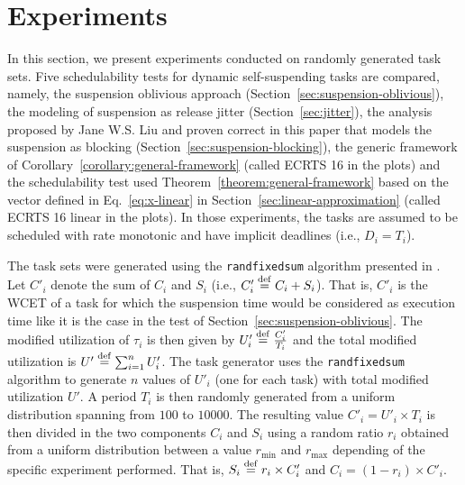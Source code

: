 \section{Experiments}
\label{sec:experiments}

In this section, we present experiments conducted on randomly generated task sets. Five schedulability tests for dynamic self-suspending tasks are compared, namely, the suspension oblivious approach (Section~\ref{sec:suspension-oblivious}), the modeling of suspension as release jitter (Section~\ref{sec:jitter}), the analysis proposed by Jane W.S. Liu and proven correct in this paper that models the suspension as blocking (Section~\ref{sec:suspension-blocking}), the generic framework of Corollary~\ref{corollary:general-framework} (called ECRTS 16 in the plots) and the schedulability test used Theorem~\ref{theorem:general-framework} based on the vector defined in Eq.~\eqref{eq:x-linear} in Section~\ref{sec:linear-approximation} (called ECRTS 16 linear in the plots). In those experiments, the tasks are assumed to be scheduled with rate monotonic and have implicit deadlines (i.e., $D_i = T_i$).

The task sets were generated using the \texttt{randfixedsum} algorithm presented in \cite{Emberson-taskSetGeneration-2010}. Let $C'_i$ denote the sum of $C_i$ and $S_i$ (i.e., $C'_i \stackrel{\mathrm{def}}{=} C_i + S_i$). That is, $C'_i$ is the WCET of a task for which the suspension time would be considered as execution time like it is the case in the test of Section~\ref{sec:suspension-oblivious}. The modified utilization of $\tau_i$ is then given by $U'_i \stackrel{\mathrm{def}}{=} \frac{C'_i}{T_i}$ and the total modified utilization is $U' \stackrel{\mathrm{def}}{=} \sum_{i=1}^n U'_i$. The task generator uses the \texttt{randfixedsum} algorithm to generate $n$ values of $U'_i$ (one for each task) with total modified utilization $U'$. A period $T_i$ is then randomly generated from a uniform distribution spanning from $100$ to $10000$. The resulting value $C'_i = U'_i \times T_i$ is then divided in the two components $C_i$ and $S_i$ using a random ratio $r_i$ obtained from a uniform distribution between a value $r_{\min}$ and $r_{\max}$ depending of the specific experiment performed. That is, $S_i \stackrel{\mathrm{def}}{=} r_i \times C'_i$ and $C_i = (1 - r_i) \times C'_i$. 

